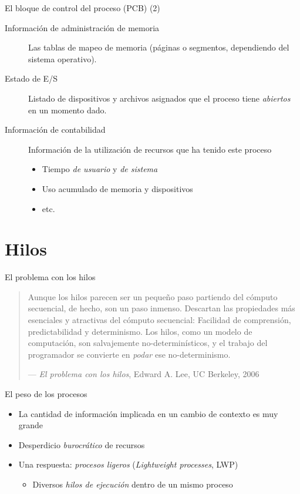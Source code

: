 \documentclass[presentation]{beamer}
\begin{document}
\begin{frame}[label={sec:org39082bf}]{El bloque de control del proceso (PCB) (2)}
\begin{description}
\item[{Información de administración de memoria}] Las tablas de mapeo de
memoria (páginas o segmentos, dependiendo del sistema
operativo).

\item[{Estado de E/S}] Listado de dispositivos y archivos asignados que el
proceso tiene \emph{abiertos} en un momento dado.

\item[{Información de contabilidad}] Información de la utilización de
recursos que ha tenido este proceso
\begin{itemize}
\item Tiempo \emph{de usuario} y \emph{de sistema}
\item Uso acumulado de memoria y dispositivos
\item etc.
\end{itemize}
\end{description}
\end{frame}

\section{Hilos}
\label{sec:orgc621d9b}

\begin{frame}[label={sec:org8ef5a5e}]{El problema con los hilos}
\begin{quote}
Aunque los hilos parecen ser un pequeño paso partiendo del cómputo
secuencial, de hecho, son un paso inmenso. Descartan las propiedades
más esenciales y atractivas del cómputo secuencial: Facilidad de
comprensión, predictabilidad y determinismo. Los hilos, como un modelo
de computación, son salvajemente no-determinísticos, y el trabajo del
programador se convierte en \emph{podar} ese no-determinismo.

— \emph{El problema con los hilos}, Edward A. Lee, UC Berkeley, 2006
\end{quote}
\end{frame}

\begin{frame}[label={sec:orge07f904}]{El peso de los procesos}
\begin{itemize}
\item La cantidad de información implicada en un cambio de contexto es
muy grande
\item Desperdicio \emph{burocrático} de recursos
\item Una respuesta: \emph{procesos ligeros} (\emph{Lightweight processes}, LWP)
\begin{itemize}
\item Diversos \emph{hilos de ejecución} dentro de un mismo proceso
\end{itemize}
\end{itemize}
\end{frame}
\end{document}
